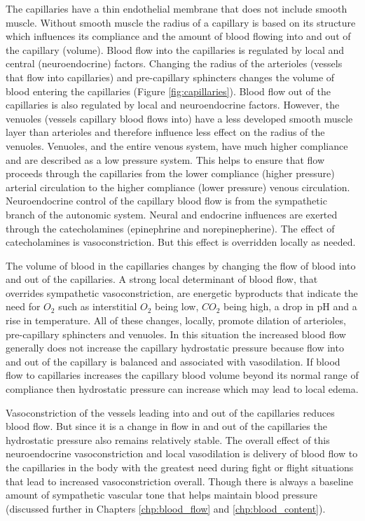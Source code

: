 The capillaries have a thin endothelial membrane that does not include smooth muscle. Without smooth muscle the radius of a capillary is based on its structure which influences its compliance and the amount of blood flowing into and out of the capillary (volume). Blood flow into the capillaries is regulated by local and central (neuroendocrine) factors. Changing the radius of the arterioles (vessels that flow into capillaries) and pre-capillary sphincters changes the volume of blood entering the capillaries (Figure \ref{fig:capillaries}). Blood flow out of the capillaries is also regulated by local and neuroendocrine factors. However, the venuoles (vessels capillary blood flows into) have a less developed smooth muscle layer than arterioles and therefore influence less effect on the radius of the venuoles. Venuoles, and the entire venous system, have much higher compliance and are described as a low pressure system. This helps to ensure that flow proceeds through the capillaries from the lower compliance (higher pressure) arterial circulation to the higher compliance (lower pressure) venous circulation. Neuroendocrine control of the capillary blood flow is from the sympathetic branch of the autonomic system. Neural and endocrine influences are exerted through the catecholamines (epinephrine and norepinepherine). The effect of catecholamines is vasoconstriction. But this effect is overridden locally as needed. 

The volume of blood in the capillaries changes by changing the flow of blood into and out of the capillaries. A strong local determinant of blood flow, that overrides sympathetic vasoconstriction, are energetic byproducts that indicate the need for $O_2$ such as interstitial $O_2$ being low, $CO_2$ being high, a drop in pH and a rise in temperature. All of these changes, locally, promote dilation of arterioles, pre-capillary sphincters and venuoles. In this situation the increased blood flow generally does not increase the capillary hydrostatic pressure because flow into and out of the capillary is balanced and associated with vasodilation. If blood flow to capillaries increases the capillary blood volume beyond its normal range of compliance then hydrostatic pressure can increase which may lead to local edema.

Vasoconstriction of the vessels leading into and out of the capillaries reduces blood flow. But since it is a change in flow in and out of the capillaries the hydrostatic pressure also remains relatively stable. The overall effect of this neuroendocrine vasoconstriction and local vasodilation is delivery of blood flow to the capillaries in the body with the greatest need during fight or flight situations that lead to increased vasoconstriction overall. Though there is always a baseline amount of sympathetic vascular tone that helps maintain blood pressure (discussed further in Chapters \ref{chp:blood_flow} and \ref{chp:blood_content}).

